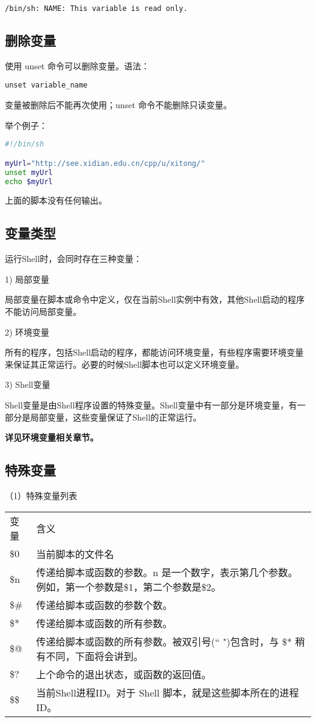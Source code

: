 \verb|/bin/sh: NAME: This variable is read only.|


\subsection{删除变量}
使用 unset 命令可以删除变量。语法：

\verb|unset variable_name|

变量被删除后不能再次使用；unset 命令不能删除只读变量。

举个例子：
\begin{lstlisting}[language=sh]
#!/bin/sh

myUrl="http://see.xidian.edu.cn/cpp/u/xitong/"
unset myUrl
echo $myUrl
\end{lstlisting}
上面的脚本没有任何输出。


\subsection{变量类型}
运行Shell时，会同时存在三种变量：

1) 局部变量

局部变量在脚本或命令中定义，仅在当前Shell实例中有效，其他Shell启动的程序不能访问局部变量。

2) 环境变量

所有的程序，包括Shell启动的程序，都能访问环境变量，有些程序需要环境变量来保证其正常运行。必要的时候Shell脚本也可以定义环境变量。

3) Shell变量

Shell变量是由Shell程序设置的特殊变量。Shell变量中有一部分是环境变量，有一部分是局部变量，这些变量保证了Shell的正常运行。

\textbf{详见环境变量相关章节。}


\subsection{特殊变量}
（1）特殊变量列表

\begin{center}
{\wuhao
\begin{tabular}{l|l}
变量&含义\\
\$0 &当前脚本的文件名\\
\$n	&传递给脚本或函数的参数。n 是一个数字，表示第几个参数。例如，第一个参数是\$1，第二个参数是\$2。\\
\$\#&	传递给脚本或函数的参数个数。\\
\$*	&传递给脚本或函数的所有参数。\\
\$@ &	传递给脚本或函数的所有参数。被双引号(`` ")包含时，与 \$* 稍有不同，下面将会讲到。\\
\$?	&上个命令的退出状态，或函数的返回值。\\
\$\$&	当前Shell进程ID。对于 Shell 脚本，就是这些脚本所在的进程ID。\\
\end{tabular}
}
\end{center}

